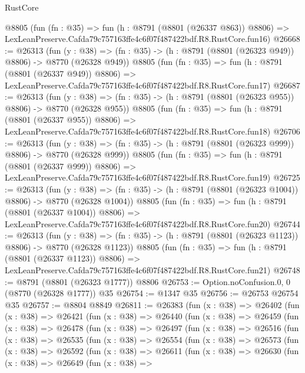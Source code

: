 \begin{lexlean}{RustCore}
\begin{coremodule}
    @8805
    (fun (fn : @35) =>
    fun (h : @8791 (@8801 (@26337 @863)) @8806) =>
    LexLeanPreserve.Cafda79c757163ffe4c6f07f487422bdf.R8.RustCore.fun16)
@26668 := @26313
    (fun (y : @38) => (fn : @35) -> (h : @8791 (@8801 (@26323 @949)) @8806) -> @8770 (@26328 @949))
    @8805
    (fun (fn : @35) =>
    fun (h : @8791 (@8801 (@26337 @949)) @8806) =>
    LexLeanPreserve.Cafda79c757163ffe4c6f07f487422bdf.R8.RustCore.fun17)
@26687 := @26313
    (fun (y : @38) => (fn : @35) -> (h : @8791 (@8801 (@26323 @955)) @8806) -> @8770 (@26328 @955))
    @8805
    (fun (fn : @35) =>
    fun (h : @8791 (@8801 (@26337 @955)) @8806) =>
    LexLeanPreserve.Cafda79c757163ffe4c6f07f487422bdf.R8.RustCore.fun18)
@26706 := @26313
    (fun (y : @38) => (fn : @35) -> (h : @8791 (@8801 (@26323 @999)) @8806) -> @8770 (@26328 @999))
    @8805
    (fun (fn : @35) =>
    fun (h : @8791 (@8801 (@26337 @999)) @8806) =>
    LexLeanPreserve.Cafda79c757163ffe4c6f07f487422bdf.R8.RustCore.fun19)
@26725 := @26313
    (fun (y : @38) =>
    (fn : @35) -> (h : @8791 (@8801 (@26323 @1004)) @8806) -> @8770 (@26328 @1004))
    @8805
    (fun (fn : @35) =>
    fun (h : @8791 (@8801 (@26337 @1004)) @8806) =>
    LexLeanPreserve.Cafda79c757163ffe4c6f07f487422bdf.R8.RustCore.fun20)
@26744 := @26313
    (fun (y : @38) =>
    (fn : @35) -> (h : @8791 (@8801 (@26323 @1123)) @8806) -> @8770 (@26328 @1123))
    @8805
    (fun (fn : @35) =>
    fun (h : @8791 (@8801 (@26337 @1123)) @8806) =>
    LexLeanPreserve.Cafda79c757163ffe4c6f07f487422bdf.R8.RustCore.fun21)
@26748 := @8791 (@8801 (@26323 @1777)) @8806
@26753 := Option.noConfusion.{0, 0} (@8770 (@26328 @1777)) @35
@26754 := @1347 @35
@26756 := @26753 @26754 @35
@26757 := @8804 @8849
@26811 := @26383
    (fun (x : @38) =>
    @26402
      (fun (x : @38) =>
      @26421
        (fun (x : @38) =>
        @26440
          (fun (x : @38) =>
          @26459
            (fun (x : @38) =>
            @26478
              (fun (x : @38) =>
              @26497
                (fun (x : @38) =>
                @26516
                  (fun (x : @38) =>
                  @26535
                    (fun (x : @38) =>
                    @26554
                      (fun (x : @38) =>
                      @26573
                        (fun (x : @38) =>
                        @26592
                          (fun (x : @38) =>
                          @26611
                            (fun (x : @38) =>
                            @26630
                              (fun (x : @38) =>
                              @26649
                                (fun (x : @38) =>

\end{coremodule}
\end{lexlean}
